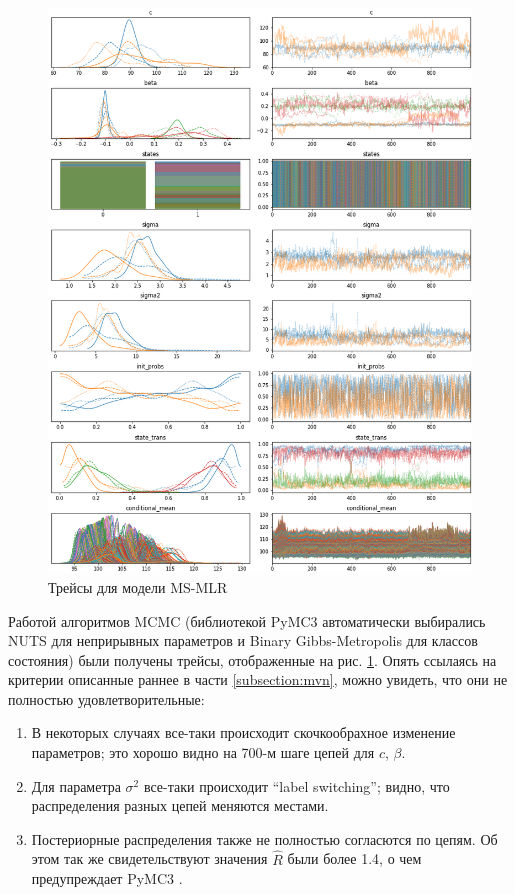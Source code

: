 \documentclass[a4paper,14pt]{extreport}
\begin{document}
\begin{figure}[H]
	\includegraphics[width=\linewidth]{img/gen/pp_ms_arx_trace.png}
	\caption{Трейсы для модели MS-MLR}
	\label{fig:pp_ms_arx_trace}
\end{figure}

Работой алгоритмов MCMC (библиотекой PyMC3 автоматически выбирались NUTS для неприрывных параметров и Binary Gibbs-Metropolis для классов состояния) были получены трейсы, отображенные на рис. \ref{fig:pp_ms_arx_trace}. Опять ссылаясь на критерии \cite{stan_user_guide} описанные раннее в части \ref{subsection:mvn}, можно увидеть, что они не полностью удовлетворительные: 

\begin{enumerate}
	\item В некоторых случаях все-таки происходит скочкообрахное изменение параметров; это хорошо видно на 700-м шаге цепей для $c$, $\beta$.
	\item Для параметра $\sigma^2$ все-таки происходит ``label switching''; видно, что распределения разных цепей меняются местами.
	\item Постериорные распределения также не полностью согласются по цепям. Об этом так же свидетельствуют значения $\hat{R}$ были более 1.4, о чем предупреждает PyMC3 \cite{pymc3_2016,nuts_hoffman_gelman}.
\end{enumerate}
\end{document}
